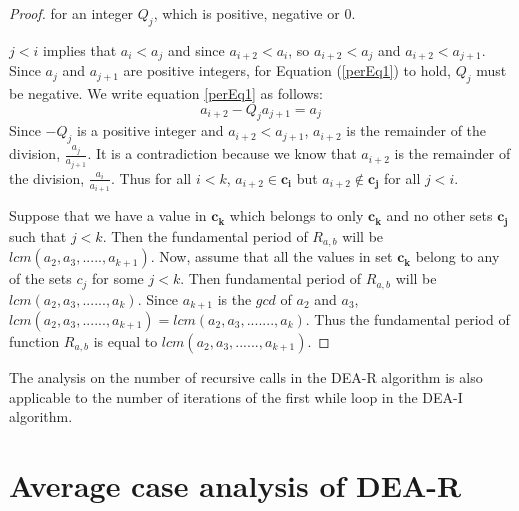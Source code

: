 \documentclass[pdflatex,sn-mathphys-num]{sn-jnl}%
\theoremstyle{thmstyleone}%
\theoremstyle{thmstyletwo}%
\theoremstyle{thmstylethree}%
\begin{document}
\begin{proof}
for an integer $Q_j$, which is positive, negative or $0$. 
\par $j<i$ implies that  $a_i<a_j$ and since $a_{i+2}<a_i$, so $a_{i+2}<a_j$ and $a_{i+2}<a_{j+1}$. Since $a_j$ and $a_{j+1}$ are positive integers, for Equation (\ref{perEq1}) to hold, $Q_j$ must be negative. We write equation \ref{perEq1} as follows:
\begin{equation}\label{perEq2}
    a_{i+2}-Q_ja_{j+1}=a_j
\end{equation}
Since $-Q_j$ is a positive integer and $a_{i+2}<a_{j+1}$, $a_{i+2}$ is the remainder of the division, $\frac{a_j}{a_{j+1}}$. It is a contradiction because we know that $a_{i+2}$ is the remainder of the division, $\frac{a_i}{a_{i+1}}$. Thus for all $i<k$, $a_{i+2}\in \mathbf{c_i}$ but $a_{i+2} \notin \mathbf{c_j}$ for all $j<i$. 
\par Suppose that we have a value in $\mathbf{c_k}$ which belongs to only $\mathbf{c_k}$ and no other sets $\mathbf{c_j}$ such that $j<k$. Then the fundamental period of $R_{a,b}$ will be $lcm(a_2,a_3,.....,a_{k+1})$. Now, assume that all the values in set $\mathbf{c_k}$ belong to any of the sets $c_j$ for some $j<k$. Then fundamental period of $R_{a,b}$ will be $lcm(a_2,a_3,......,a_{k})$. Since $a_{k+1}$ is the $gcd$ of $a_2$ and $a_3$, $lcm(a_2,a_3,......,a_{k+1})=lcm(a_2,a_3,.......,a_k)$. Thus the fundamental period of function $R_{a,b}$ is equal to $lcm(a_2,a_3,......,a_{k+1})$.
\end{proof}
 


The analysis on the number of recursive calls in the DEA-R algorithm is also applicable to the number of iterations of the first while loop in the DEA-I algorithm.




%


 
 \section{Average case analysis of DEA-R}\label{secACAD}
 
\end{document}
